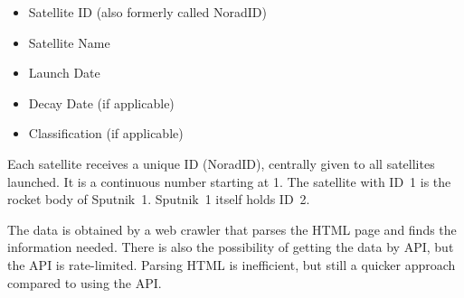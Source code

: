 \begin{itemize}
	\item Satellite ID (also formerly called NoradID)
	\item Satellite Name
	\item Launch Date
	\item Decay Date (if applicable)
	\item Classification (if applicable)
\end{itemize}

Each satellite receives a unique ID (NoradID), centrally given to all
satellites launched. It is a continuous number starting at 1. The satellite
with ID~1 is the rocket body of Sputnik~1. Sputnik~1 itself holds ID~2.

The data is obtained by a web crawler that parses the HTML page and finds the
information needed. There is also the possibility of getting the data by API,
but the API is rate-limited. Parsing HTML is inefficient, but still a quicker
approach compared to using the API.
